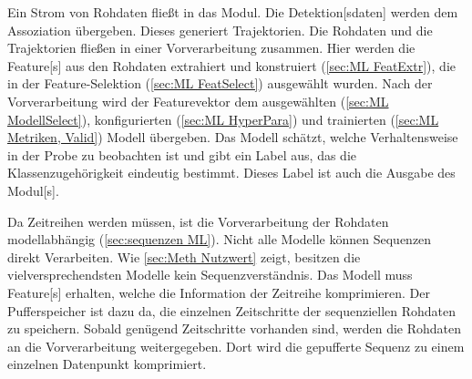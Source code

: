 Ein Strom von Rohdaten fließt in das \gls{Modul}. Die \gls{Detektion}[sdaten] werden dem \gls{Assoziation} übergeben. Dieses generiert Trajektorien. Die Rohdaten und die Trajektorien fließen in einer Vorverarbeitung zusammen. Hier werden die \gls{Feature}[s] aus den Rohdaten extrahiert und konstruiert (\autoref{sec:ML FeatExtr}), die in der \gls{Feature}-Selektion (\autoref{sec:ML FeatSelect}) ausgewählt wurden. Nach der Vorverarbeitung wird der \gls{Featurevektor} dem ausgewählten (\autoref{sec:ML ModellSelect}), konfigurierten (\autoref{sec:ML HyperPara}) und trainierten (\autoref{sec:ML Metriken, Valid}) Modell übergeben. Das Modell schätzt, welche Verhaltensweise in der Probe zu beobachten ist und gibt ein \gls{Label} aus, das die Klassenzugehörigkeit eindeutig bestimmt. Dieses \gls{Label} ist auch die Ausgabe des \gls{Modul}[s]. \par

Da Zeitreihen  werden müssen, ist die Vorverarbeitung der Rohdaten modellabhängig (\autoref{sec:sequenzen ML}). Nicht alle Modelle können Sequenzen direkt Verarbeiten. Wie \autoref{sec:Meth Nutzwert} zeigt, besitzen die vielversprechendsten Modelle kein Sequenzverständnis. Das Modell muss \gls{Feature}[s] erhalten, welche die Information der Zeitreihe komprimieren. Der Pufferspeicher ist dazu da, die einzelnen Zeitschritte der sequenziellen Rohdaten zu speichern. Sobald genügend Zeitschritte vorhanden sind, werden die Rohdaten an die Vorverarbeitung weitergegeben. Dort wird die gepufferte Sequenz zu einem einzelnen Datenpunkt komprimiert. 